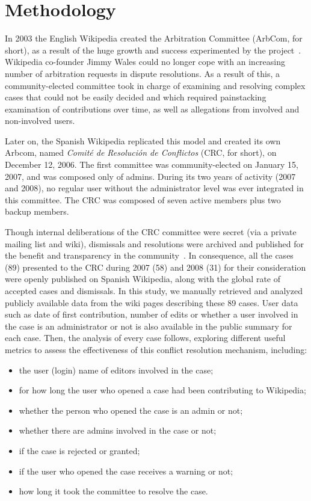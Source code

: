 \documentclass{sigchi}
\begin{document}
\section{Methodology}

In 2003 the English Wikipedia created the Arbitration Committee (ArbCom, for short), as a result 
of the huge growth and success experimented by the project~\cite{wiki:arbcom, riehle2006}. 
Wikipedia co-founder Jimmy Wales could no longer cope with an increasing number
of arbitration requests in dispute resolutions.
As a result of this, a community-elected committee took in charge of examining and resolving
complex cases that could not be easily decided and which required painstacking examination of
contributions over time, as well as allegations from involved and non-involved users. 

Later on, the Spanish Wikipedia
replicated this model and created its own Arbcom, named \textit{Comité de Resolución de Conflictos}
(CRC, for short), on December 12, 2006. The first committee was community-elected on January 15, 2007, and was composed only of admins. During its two years of activity (2007 and 2008), no regular user
without the administrator level was ever integrated in this committee. The CRC was composed of seven active members plus two backup members.

Though internal deliberations of the CRC committee were secret (via a private mailing list and wiki),
dismissals and resolutions were archived and published for the benefit and transparency in the community~\cite{wiki:CRC-archivo}. In
consequence, all the cases (89) presented to the CRC during 2007 (58) and 2008 (31) for their
consideration were openly published on Spanish Wikipedia, along with the global rate of accepted
cases and dismissals. In this study, we manually retrieved
and analyzed publicly available data from the wiki pages describing these 89 cases. User data 
such as date of first contribution, number of edits or whether a user involved in the case is an
administrator or not is also available in the public summary for each case. Then, the analysis of 
every case follows, exploring different useful metrics to assess the effectiveness of this conflict
resolution mechanism, including: 

\begin{itemize}
	\item the user (login) name of editors involved in the case;
    \item for how long the user who opened a case had been contributing to Wikipedia;
    \item whether the person who opened the case is an admin or not;
    \item whether there are admins involved in the case or not;
    \item if the case is rejected or granted;
    \item if the user who opened the case receives a warning or not;
    \item how long it took the committee to resolve the case.
\end{itemize}
\end{document}
